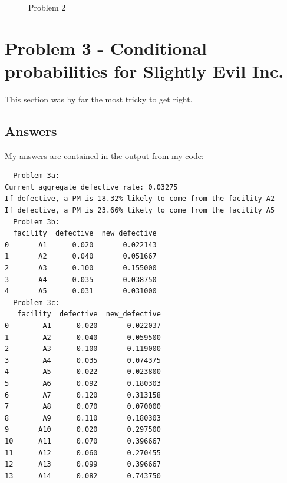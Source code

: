 \documentclass[a4paper,11pt]{article}
\begin{document}
\begin{figure}
  \caption{Problem 2}
  \label{p2_bat}
\end{figure}


\section{Problem 3 - Conditional probabilities for Slightly Evil Inc.}

This section was by far the most tricky to get right.
\subsection{Answers}
My answers are contained in the output from my code:
\begin{verbatim}
  Problem 3a:
Current aggregate defective rate: 0.03275
If defective, a PM is 18.32% likely to come from the facility A2
If defective, a PM is 23.66% likely to come from the facility A5
  Problem 3b:
  facility  defective  new_defective
0       A1      0.020       0.022143
1       A2      0.040       0.051667
2       A3      0.100       0.155000
3       A4      0.035       0.038750
4       A5      0.031       0.031000
  Problem 3c:
   facility  defective  new_defective
0        A1      0.020       0.022037
1        A2      0.040       0.059500
2        A3      0.100       0.119000
3        A4      0.035       0.074375
4        A5      0.022       0.023800
5        A6      0.092       0.180303
6        A7      0.120       0.313158
7        A8      0.070       0.070000
8        A9      0.110       0.180303
9       A10      0.020       0.297500
10      A11      0.070       0.396667
11      A12      0.060       0.270455
12      A13      0.099       0.396667
13      A14      0.082       0.743750
\end{verbatim}
\end{document}
